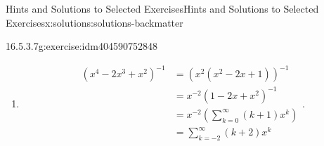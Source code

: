 \documentclass[twoside,10pt,]{book}
\numberwithin{equation}{section}
\begin{document}
\begin{solutions-chapter}{Hints and Solutions to Selected Exercises}{}{Hints and Solutions to Selected Exercises}{}{}{x:solutions:solutions-backmatter}
\begin{divisionsolution}{16.5.3.7}{}{g:exercise:idm404590752848}
\begin{enumerate}[label=(\alph*)]
\begin{equation*}
\begin{split}
&=\sum_{k=-4}^{\infty} x^k\\
\end{split}\text{.}
\end{equation*}
%
\item{}%
\begin{equation*}
\begin{split}
\left(x^4-2 x^3+x^2\right)^{-1} & =\left(x^2 \left(x^2-2 x+1\right)\right)^{-1}\\
&=x^{-2}\left(1-2x+x^2\right)^{-1}\\
& =x^{-2}\left(\sum_{k=0}^{\infty } (k+1) x^k\right)\\
&=\sum_{k=-2}^{\infty} (k+2) x^k\\
\end{split}\text{.}
\end{equation*}
%
\end{enumerate}
%
\end{divisionsolution}%
\end{solutions-chapter}
%
%
\typeout{************************************************}
\typeout{************************************************}
%
\end{document}
